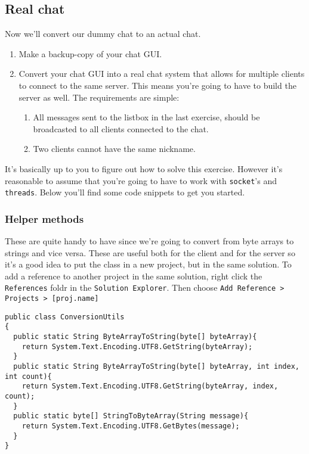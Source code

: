 \documentclass{article}
\newcounter{stepcounter}
\newenvironment{steps}{ 
  \begin{enumerate}[label=\color{red}Step \thesection-\theenumi)]
    \setcounter{enumi}{\value{stepcounter}}
}{
  \setcounter{stepcounter}{\value{enumi}}
  \end{enumerate}
}
\begin{document}
\subsection{Real chat}
Now we'll convert our dummy chat to an actual chat.
\begin{steps}
\item Make a backup-copy of your chat GUI.
\item Convert your chat GUI into a real chat system that allows for multiple clients to connect to the same server. This means you're going to have to build the server as well. The requirements are simple:
  \begin{enumerate}
    \item All messages sent to the listbox in the last exercise, should be broadcasted to all clients connected to the chat. 
    \item Two clients cannot have the same nickname.
  \end{enumerate}
\end{steps}
It's basically up to you to figure out how to solve this exercise. However it's reasonable to assume that you're going to have to work with \texttt{socket}'s and \texttt{threads}. Below you'll find some code snippets to get you started.

\subsubsection{Helper methods}
These are quite handy to have since we're going to convert from byte arrays to strings and vice versa. These are useful both for the client and for the server so it's a good idea to put the class in a new project, but in the same solution. To add a reference to another project in the same solution, right click the \texttt{References} foldr in the \texttt{Solution Explorer}. Then choose \texttt{Add Reference > Projects > [proj.name]}
\begin{lstlisting}
public class ConversionUtils
{
  public static String ByteArrayToString(byte[] byteArray){
    return System.Text.Encoding.UTF8.GetString(byteArray);
  }
  public static String ByteArrayToString(byte[] byteArray, int index, int count){
    return System.Text.Encoding.UTF8.GetString(byteArray, index, count);
  }
  public static byte[] StringToByteArray(String message){
    return System.Text.Encoding.UTF8.GetBytes(message);
  } 
}
\end{lstlisting}
\end{document}
